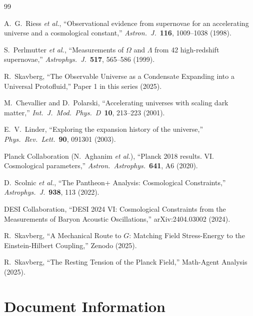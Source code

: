 \documentclass[11pt,a4paper]{article}
\theoremstyle{definition}
\theoremstyle{remark}
\begin{document}
\begin{thebibliography}{99}

A.~G.~Riess \emph{et al.}, ``Observational evidence from supernovae for an accelerating universe and a cosmological constant,'' \emph{Astron.\ J.}\ \textbf{116}, 1009--1038 (1998).

S.~Perlmutter \emph{et al.}, ``Measurements of $\Omega$ and $\Lambda$ from 42 high-redshift supernovae,'' \emph{Astrophys.\ J.}\ \textbf{517}, 565--586 (1999).

R.~Skavberg, ``The Observable Universe as a Condensate Expanding into a Universal Protofluid,'' Paper 1 in this series (2025).

M.~Chevallier and D.~Polarski, ``Accelerating universes with scaling dark matter,'' \emph{Int.\ J.\ Mod.\ Phys.\ D}\ \textbf{10}, 213--223 (2001).

E.~V.~Linder, ``Exploring the expansion history of the universe,'' \emph{Phys.\ Rev.\ Lett.}\ \textbf{90}, 091301 (2003).

Planck Collaboration (N.~Aghanim \emph{et al.}), ``Planck 2018 results. VI. Cosmological parameters,'' \emph{Astron.\ Astrophys.}\ \textbf{641}, A6 (2020).

D.~Scolnic \emph{et al.}, ``The Pantheon+ Analysis: Cosmological Constraints,'' \emph{Astrophys.\ J.}\ \textbf{938}, 113 (2022).

DESI Collaboration, ``DESI 2024 VI: Cosmological Constraints from the Measurements of Baryon Acoustic Oscillations,'' arXiv:2404.03002 (2024).

R.~Skavberg, ``A Mechanical Route to $G$: Matching Field Stress-Energy to the Einstein-Hilbert Coupling,'' Zenodo (2025).

R.~Skavberg, ``The Resting Tension of the Planck Field,'' Math-Agent Analysis (2025).

\end{thebibliography}

\section*{Document Information}
\end{document}
